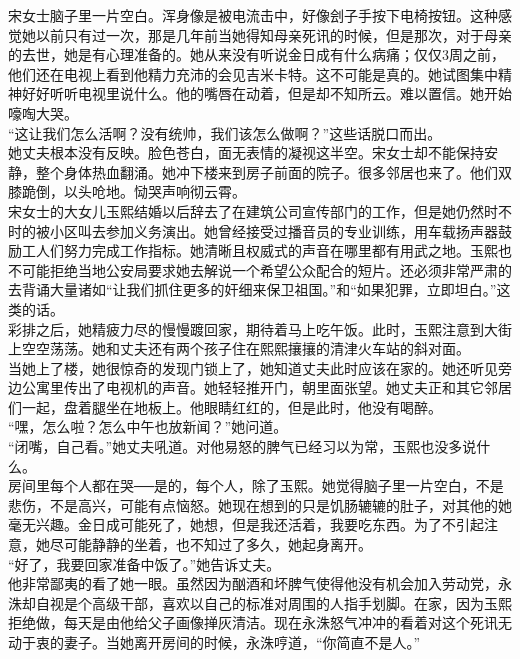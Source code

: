 宋女士脑子里一片空白。浑身像是被电流击中，好像刽子手按下电椅按钮。这种感觉她以前只有过一次，那是几年前当她得知母亲死讯的时候，但是那次，对于母亲的去世，她是有心理准备的。她从来没有听说金日成有什么病痛；仅仅3周之前，他们还在电视上看到他精力充沛的会见吉米卡特。这不可能是真的。她试图集中精神好好听听电视里说什么。他的嘴唇在动着，但是却不知所云。难以置信。她开始嚎啕大哭。\\

“这让我们怎么活啊？没有统帅，我们该怎么做啊？”这些话脱口而出。\\

她丈夫根本没有反映。脸色苍白，面无表情的凝视这半空。宋女士却不能保持安静，整个身体热血翻涌。她冲下楼来到房子前面的院子。很多邻居也来了。他们双膝跪倒，以头呛地。恸哭声响彻云霄。\\

宋女士的大女儿玉熙结婚以后辞去了在建筑公司宣传部门的工作，但是她仍然时不时的被小区叫去参加义务演出。她曾经接受过播音员的专业训练，用车载扬声器鼓励工人们努力完成工作指标。她清晰且权威式的声音在哪里都有用武之地。玉熙也不可能拒绝当地公安局要求她去解说一个希望公众配合的短片。还必须非常严肃的去背诵大量诸如“让我们抓住更多的奸细来保卫祖国。”和“如果犯罪，立即坦白。”这类的话。\\

彩排之后，她精疲力尽的慢慢踱回家，期待着马上吃午饭。此时，玉熙注意到大街上空空荡荡。她和丈夫还有两个孩子住在熙熙攘攘的清津火车站的斜对面。\\

当她上了楼，她很惊奇的发现门锁上了，她知道丈夫此时应该在家的。她还听见旁边公寓里传出了电视机的声音。她轻轻推开门，朝里面张望。她丈夫正和其它邻居们一起，盘着腿坐在地板上。他眼睛红红的，但是此时，他没有喝醉。\\

“嘿，怎么啦？怎么中午也放新闻？”她问道。\\

“闭嘴，自己看。”她丈夫吼道。对他易怒的脾气已经习以为常，玉熙也没多说什么。\\

房间里每个人都在哭──是的，每个人，除了玉熙。她觉得脑子里一片空白，不是悲伤，不是高兴，可能有点恼怒。她现在想到的只是饥肠辘辘的肚子，对其他的她毫无兴趣。金日成可能死了，她想，但是我还活着，我要吃东西。为了不引起注意，她尽可能静静的坐着，也不知过了多久，她起身离开。\\

“好了，我要回家准备中饭了。”她告诉丈夫。\\

他非常鄙夷的看了她一眼。虽然因为酗酒和坏脾气使得他没有机会加入劳动党，永洙却自视是个高级干部，喜欢以自己的标准对周围的人指手划脚。在家，因为玉熙拒绝做，每天是由他给父子画像掸灰清洁。现在永洙怒气冲冲的看着对这个死讯无动于衷的妻子。当她离开房间的时候，永洙哼道，“你简直不是人。”\\

